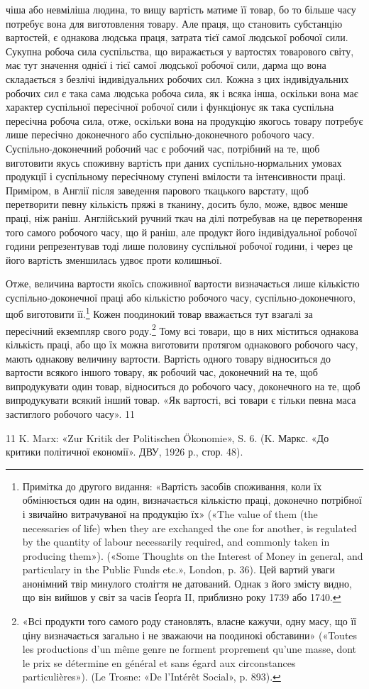 чіша або невміліша людина, то вищу вартість матиме її товар,
бо то більше часу потребує вона для виготовлення товару. Але
праця, що становить субстанцію вартостей, є однакова людська
праця, затрата тієї самої людської робочої сили. Сукупна робоча
сила суспільства, що виражається у вартостях товарового світу,
має тут значення однієї і тієї самої людської робочої сили, дарма
що вона складається з безлічі індивідуальних робочих сил. Кожна
з цих індивідуальних робочих сил є така сама людська робоча
сила, як і всяка інша, оскільки вона має характер суспільної
пересічної робочої сили і функціонує як така суспільна пересічна
робоча сила, отже, оскільки вона на продукцію якогось товару
потребує лише пересічно доконечного або суспільно-доконечного
робочого часу. Суспільно-доконечний робочий час є робочий
час, потрібний на те, щоб виготовити якусь споживну вартість
при даних суспільно-нормальних умовах продукції і суспільному
пересічному ступені вмілости та інтенсивности праці. Приміром,
в Англії після заведення парового ткацького варстату,
щоб перетворити певну кількість пряжі в тканину, досить було,
може, вдвоє менше праці, ніж раніш. Англійський ручний ткач
на ділі потребував на це перетворення того самого робочого часу,
що й раніш, але продукт його індивідуальної робочої години
репрезентував тоді лише половину суспільної робочої години, і
через це його вартість зменшилась удвоє проти колишньої.

Отже, величина вартости якоїсь споживної вартости визначається
лише кількістю суспільно-доконечної праці або кількістю
робочого часу, суспільно-доконечного, щоб виготовити
її.\footnote{
Примітка до другого видання: «Вартість засобів споживання, коли
їх обмінюється один на один, визначається кількістю праці, доконечно потрібної
і звичайно витрачуваної на продукцію їх» («The value of them
(the necessaries of life) when they are exchanged the one for another, is
regulated by the quantity of labour necessarily required, and commonly
taken in producing them»). («Some Thoughts on the Interest of Money in
general, and particulary in the Public Funds etc.», London, p. 36). Цей
вартий уваги анонімний твір минулого століття не датований. Однак
з його змісту видно, що він вийшов у світ за часів Ґеорґа II, приблизно
року 1739 або 1740.
} Кожен поодинокий товар вважається тут взагалі за пересічний
екземпляр свого роду.\footnote{
«Всі продукти того самого роду становлять, власне кажучи, одну
масу, що її ціну визначається загально і не зважаючи на поодинокі обставини»
(«Toutes les productions d’un même genre ne forment proprement
qu’une masse, dont le prix se détermine en général et sans égard aux circonstances
particulières»). (Le Trosne: «De l’Intérêt Social», p. 893).
} Тому всі товари, що в них міститься
однакова кількість праці, або що їх можна виготовити протягом
однакового робочого часу, мають однакову величину вартости.
Вартість одного товару відноситься до вартости всякого іншого
товару, як робочий час, доконечний на те, щоб випродукувати
один товар, відноситься до робочого часу, доконечного на те,
щоб випродукувати всякий інший товар. «Як вартості, всі товари
є тільки певна маса застиглого робочого часу». 11

11    K. Marx: «Zur Kritik der Politischen Ökonomie», S. 6. (K. Маркс.
«До критики політичної економії». ДВУ, 1926 р., стор. 48).
